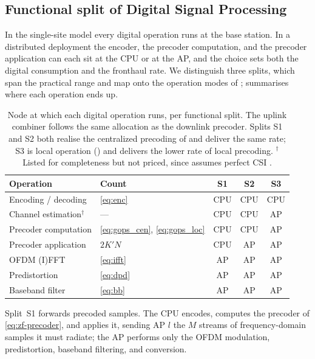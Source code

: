 \subsection{Functional split of Digital Signal Processing}
\label{ssec:split}

In the single-site model every digital operation runs at the base station. In a
distributed deployment the encoder, the precoder computation, and the precoder
application can each sit at the CPU or at the AP, and the choice sets both the
digital consumption and the fronthaul rate. We distinguish three splits, which
span the practical range and map onto the operation modes of
;  summarises where each operation ends up.

\begin{table}[t]
\centering
\caption{Node at which each digital operation runs, per functional split. The
uplink combiner follows the same allocation as the downlink precoder. Splits S1
and S2 both realise the centralized precoding of  and
deliver the same rate; S3 is local operation () and delivers
the lower rate of local precoding. $^{\dagger}$Listed for completeness but not
priced, since  assumes perfect CSI .}
\label{tab:split}
\begin{tabular}{@{}llccc@{}}
\toprule
Operation & Count & S1 & S2 & S3 \\
\midrule
Encoding / decoding    & \eqref{eq:enc}  & CPU & CPU & CPU \\
Channel estimation$^{\dagger}$ & ---     & CPU & CPU & AP  \\
Precoder computation   & \eqref{eq:gops_cen}, \eqref{eq:gops_loc}
                                         & CPU & CPU & AP  \\
Precoder application   & $2K'N$          & CPU & AP  & AP  \\
OFDM (I)FFT            & \eqref{eq:ifft} & AP  & AP  & AP  \\
Predistortion          & \eqref{eq:dpd}  & AP  & AP  & AP  \\
Baseband filter        & \eqref{eq:bb}   & AP  & AP  & AP  \\
\bottomrule
\end{tabular}
\end{table}

Split~S1 forwards precoded samples. The CPU encodes, computes the precoder of
\eqref{eq:zf-precoder}, and applies it, sending AP $l$ the $M$ streams of
frequency-domain samples it must radiate; the AP performs only the OFDM
modulation, predistortion, baseband filtering, and conversion. 

